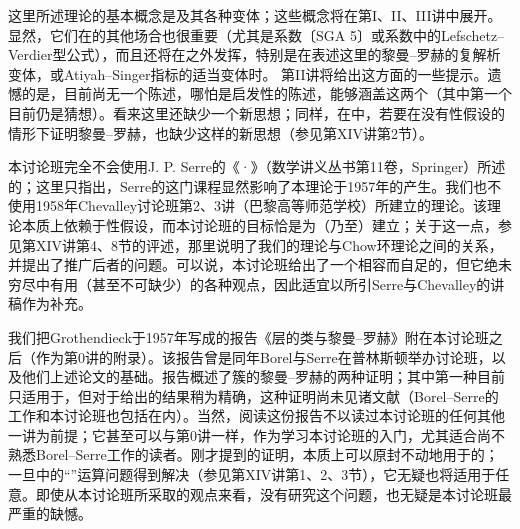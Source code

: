这里所述理论的基本概念是及其各种变体；这些概念将在第I、II、III讲中展开。显然，它们在的其他场合也很重要（尤其是系数〔SGA 5〕或系数中的Lefschetz--Verdier型公式），而且还将在之外发挥，特别是在表述这里的黎曼--罗赫的复解析变体，或Atiyah--Singer指标的适当变体时。
第II讲将给出这方面的一些提示。遗憾的是，目前尚无一个陈述，哪怕是启发性的陈述，能够涵盖这两个（其中第一个目前仍是猜想）。看来这里还缺少一个新思想；同样，在中，若要在没有性假设的情形下证明黎曼--罗赫，也缺少这样的新思想（参见第XIV讲第2节）。

本讨论班完全不会使用J. P. Serre的《·》（数学讲义丛书第11卷，Springer）所述的；这里只指出，Serre的这门课程显然影响了本理论于1957年的产生。我们也不使用1958年Chevalley讨论班第2、3讲（巴黎高等师范学校）所建立的理论。该理论本质上依赖于性假设，而本讨论班的目标恰是为（乃至）建立；关于这一点，参见第XIV讲第4、8节的评述，那里说明了我们的理论与Chow环理论之间的关系，并提出了推广后者的问题。可以说，本讨论班给出了一个相容而自足的，但它绝未穷尽中有用（甚至不可缺少）的各种观点，因此适宜以所引Serre与Chevalley的讲稿作为补充。

我们把Grothendieck于1957年写成的报告《层的类与黎曼--罗赫》附在本讨论班之后（作为第0讲的附录）。该报告曾是同年Borel与Serre在普林斯顿举办讨论班，以及他们上述论文的基础。报告概述了簇的黎曼--罗赫的两种证明；其中第一种目前只适用于，但对于给出的结果稍为精确，这种证明尚未见诸文献（Borel--Serre的工作和本讨论班也包括在内）。当然，阅读这份报告不以读过本讨论班的任何其他一讲为前提；它甚至可以与第0讲一样，作为学习本讨论班的入门，尤其适合尚不熟悉Borel--Serre工作的读者。刚才提到的证明，本质上可以原封不动地用于的；
一旦中的“”运算问题得到解决（参见第XIV讲第1、2、3节），它无疑也将适用于任意。即使从本讨论班所采取的观点来看，没有研究这个问题，也无疑是本讨论班最严重的缺憾。


